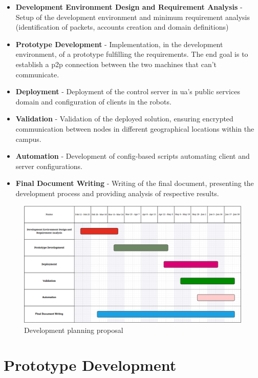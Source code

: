 \documentclass[11pt,twoside,a4paper]{report}
\begin{document}
\begin{itemize}
  \item \textbf{Development Environment Design and Requirement Analysis} - Setup of the development environment and minimum requirement analysis (identification of packets, accounts creation and domain definitions)
  \item \textbf{Prototype Development} - Implementation, in the development environment, of a prototype fulfilling the requirements. The end goal is to establish a \ac{p2p} connection between the two machines that can't communicate.
  \item \textbf{Deployment} - Deployment of the control server in \ac{ua}'s public services domain and configuration of clients in the robots.
  \item \textbf{Validation} - Validation of the deployed solution, ensuring encrypted communication between nodes in different geographical locations within the campus.
  \item \textbf{Automation} - Development of config-based scripts automating client and server configurations.
  \item \textbf{Final Document Writing} - Writing of the final document, presenting the development process and providing analysis of respective results.
\end{itemize}

\begin{figure}[h]
\centering
\includegraphics[width=1\textwidth]{gantt.png}
\caption{Development planning proposal}
\label{fig:gantt}
\end{figure}

\chapter{Prototype Development}
\end{document}
